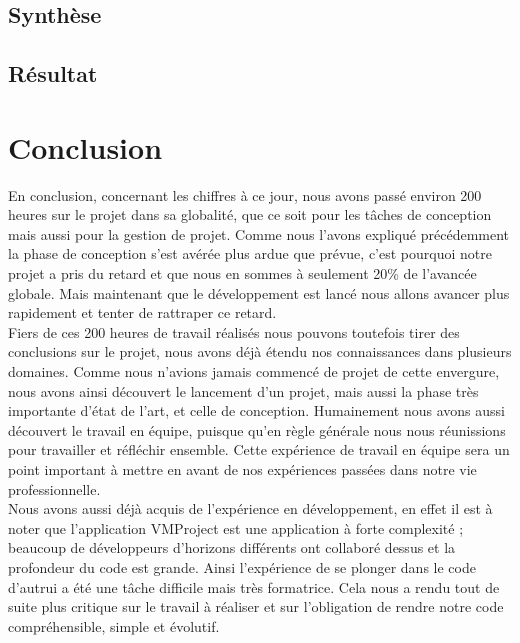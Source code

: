 \documentclass[12pt]{report}
\begin{document}
	\section{Synthèse}
	
	\section{Résultat}
	

\chapter*{Conclusion}

En conclusion, concernant les chiffres à ce jour, nous avons passé environ 200 heures sur le projet dans sa globalité, que ce soit pour les tâches de conception mais aussi pour la gestion de projet. Comme nous l’avons expliqué précédemment la phase de conception s’est avérée plus ardue que prévue, c’est pourquoi notre projet a pris du retard et que nous en sommes à seulement 20\% de l’avancée globale. Mais maintenant que le développement est lancé nous allons avancer plus rapidement et tenter de rattraper ce retard.\\

Fiers de ces 200 heures de travail réalisés nous pouvons toutefois tirer des conclusions sur le projet, nous avons déjà étendu nos connaissances dans plusieurs domaines. Comme nous n’avions jamais commencé de projet de cette envergure, nous avons ainsi découvert le lancement d’un projet, mais aussi la phase très importante d’état de l’art, et celle de conception. Humainement nous avons aussi découvert le travail en équipe, puisque qu’en règle générale nous nous réunissions pour travailler et réfléchir ensemble. Cette expérience de travail en équipe sera un point important à mettre en avant de nos expériences passées dans notre vie professionnelle. \\

Nous avons aussi déjà acquis de l’expérience en développement, en effet il est à noter que l’application VMProject est une application à forte complexité ; beaucoup de développeurs d’horizons différents ont collaboré dessus et la profondeur du code est grande. Ainsi l’expérience de se plonger dans le code d’autrui a été une tâche difficile mais très formatrice. Cela nous a rendu tout de suite plus critique sur le travail à réaliser et sur l’obligation de rendre notre code compréhensible, simple et évolutif.\\
\end{document}
